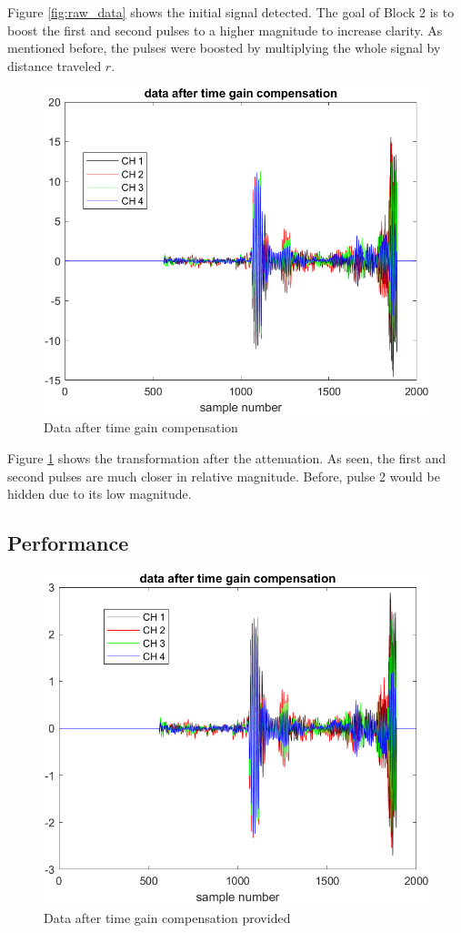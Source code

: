     Figure \ref{fig:raw_data} shows the initial signal detected. The goal of Block 2 is to boost the first and second pulses to a higher magnitude to increase clarity. As mentioned before, the pulses were boosted by multiplying the whole signal by distance traveled $r$.

    \begin{figure}[H]
        \centering
        \includegraphics[width=0.5\linewidth]{figures/time_gain_1.png}
        \caption{Data after time gain compensation}
        \label{fig:time_gain1}
    \end{figure}

    
    Figure \ref{fig:time_gain1} shows the transformation after the attenuation. As seen, the first and second pulses are much closer in relative magnitude. Before, pulse 2 would be hidden due to its low magnitude. 

    \subsection{Performance}

    \begin{figure}[H]
        \centering
        \includegraphics[width=0.5\linewidth]{figures/TGC_before.png}
        \caption{Data after time gain compensation provided}
        \label{fig:time_gain2}
    \end{figure}

